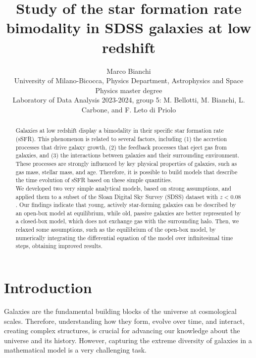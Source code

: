 \documentclass[fleqn,usenatbib]{mnras}
\title[]{Study of the star formation rate bimodality in SDSS galaxies at low redshift}
\author[Marco Bianchi]{
Marco Bianchi
\\
University of Milano-Bicocca, Physics Department, Astrophysics and Space Physics master degree\\
Laboratory of Data Analysis 2023-2024, group 5: M. Bellotti, M. Bianchi, L. Carbone, and F. Leto di Priolo
}
\begin{document}
\label{firstpage}
\pagerange{\pageref{firstpage}--\pageref{lastpage}}
\maketitle

\begin{abstract}
Galaxies at low redshift display a bimodality in their specific star formation rate (sSFR). This phenomenon is related to several factors, including (1) the accretion processes that drive galaxy growth, (2) the feedback processes that eject gas from galaxies, and (3) the interactions between galaxies and their surrounding environment. These processes are strongly influenced by key physical properties of galaxies, such as gas mass, stellar mass, and age. Therefore, it is possible to build models that describe the time evolution of sSFR based on these simple quantities. \\
We developed two very simple analytical models, based on strong assumptions, and applied them to a subset of the Sloan Digital Sky Survey (SDSS) dataset with $z<0.08$. Our findings indicate that young, actively star-forming galaxies can be described by an open-box model at equilibrium, while old, passive galaxies are better represented by a closed-box model, which does not exchange gas with the surrounding halo. Then, we relaxed some assumptions, such as the equilibrium of the open-box model, by numerically integrating the differential equation of the model over infinitesimal time steps, obtaining improved results.
\smallskip
\end{abstract} 





\section{Introduction}\label{sec:introduction}
Galaxies are the fundamental building blocks of the universe at cosmological scales. Therefore, understanding how they form, evolve over time, and interact, creating complex structures, is crucial for advancing our knowledge about the universe and its history. However, capturing the extreme diversity of galaxies in a mathematical model is a very challenging task.
\end{document}
